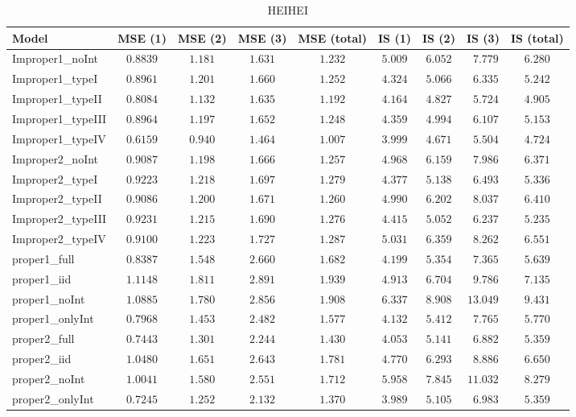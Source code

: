 \begin{table}

\caption{\label{tab:model-choice-sc12}HEIHEI}
\centering
\begin{tabular}{lcccccccc}
\hline
Model  & MSE (1) & MSE (2) & MSE (3) & MSE (total) & IS (1) & IS (2) & IS (3) & \multicolumn{1}{c}{IS (total)} \\ 
\hline
Improper1_noInt  & $0.8839$ & $1.181$ & $1.631$ & $1.232$ & $5.009$ & $6.052$ & $\phantom{0}7.779$ & $6.280$ \\
Improper1_typeI  & $0.8961$ & $1.201$ & $1.660$ & $1.252$ & $4.324$ & $5.066$ & $\phantom{0}6.335$ & $5.242$ \\
Improper1_typeII  & $0.8084$ & $1.132$ & $1.635$ & $1.192$ & $4.164$ & $4.827$ & $\phantom{0}5.724$ & $4.905$ \\
Improper1_typeIII  & $0.8964$ & $1.197$ & $1.652$ & $1.248$ & $4.359$ & $4.994$ & $\phantom{0}6.107$ & $5.153$ \\
Improper1_typeIV  & $0.6159$ & $0.940$ & $1.464$ & $1.007$ & $3.999$ & $4.671$ & $\phantom{0}5.504$ & $4.724$ \\
Improper2_noInt  & $0.9087$ & $1.198$ & $1.666$ & $1.257$ & $4.968$ & $6.159$ & $\phantom{0}7.986$ & $6.371$ \\
Improper2_typeI  & $0.9223$ & $1.218$ & $1.697$ & $1.279$ & $4.377$ & $5.138$ & $\phantom{0}6.493$ & $5.336$ \\
Improper2_typeII  & $0.9086$ & $1.200$ & $1.671$ & $1.260$ & $4.990$ & $6.202$ & $\phantom{0}8.037$ & $6.410$ \\
Improper2_typeIII  & $0.9231$ & $1.215$ & $1.690$ & $1.276$ & $4.415$ & $5.052$ & $\phantom{0}6.237$ & $5.235$ \\
Improper2_typeIV  & $0.9100$ & $1.223$ & $1.727$ & $1.287$ & $5.031$ & $6.359$ & $\phantom{0}8.262$ & $6.551$ \\
proper1_full  & $0.8387$ & $1.548$ & $2.660$ & $1.682$ & $4.199$ & $5.354$ & $\phantom{0}7.365$ & $5.639$ \\
proper1_iid  & $1.1148$ & $1.811$ & $2.891$ & $1.939$ & $4.913$ & $6.704$ & $\phantom{0}9.786$ & $7.135$ \\
proper1_noInt  & $1.0885$ & $1.780$ & $2.856$ & $1.908$ & $6.337$ & $8.908$ & $13.049$ & $9.431$ \\
proper1_onlyInt  & $0.7968$ & $1.453$ & $2.482$ & $1.577$ & $4.132$ & $5.412$ & $\phantom{0}7.765$ & $5.770$ \\
proper2_full  & $0.7443$ & $1.301$ & $2.244$ & $1.430$ & $4.053$ & $5.141$ & $\phantom{0}6.882$ & $5.359$ \\
proper2_iid  & $1.0480$ & $1.651$ & $2.643$ & $1.781$ & $4.770$ & $6.293$ & $\phantom{0}8.886$ & $6.650$ \\
proper2_noInt  & $1.0041$ & $1.580$ & $2.551$ & $1.712$ & $5.958$ & $7.845$ & $11.032$ & $8.279$ \\
proper2_onlyInt  & $0.7245$ & $1.252$ & $2.132$ & $1.370$ & $3.989$ & $5.105$ & $\phantom{0}6.983$ & $5.359$ \\
\hline 
\end{tabular}


\end{table}